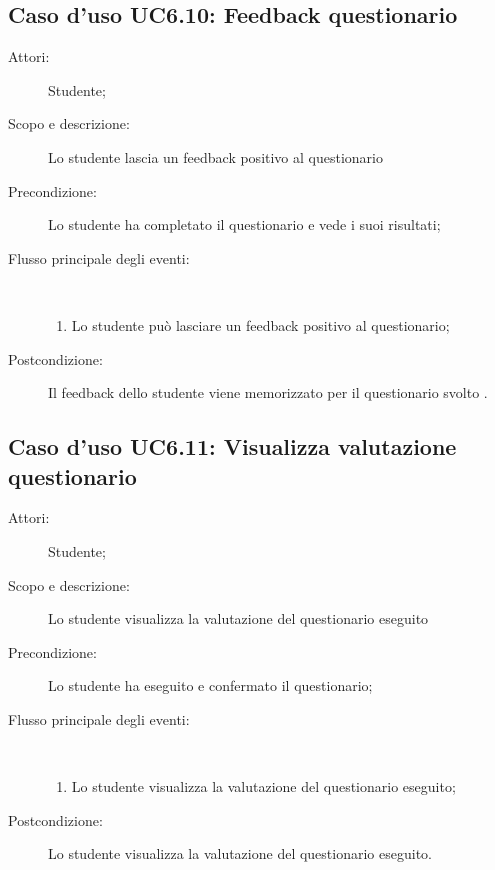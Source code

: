 \subsection{Caso d'uso UC6.10: Feedback questionario}\begin{description}
\item[Attori:] Studente;
\item[Scopo e descrizione:] Lo studente lascia un feedback positivo al questionario
      \item[Precondizione:] Lo studente ha completato il questionario e vede i suoi risultati;

        \item[Flusso principale degli eventi:] \ 
 \begin{enumerate}
          \item Lo studente può lasciare un feedback positivo al questionario;

      \end{enumerate}
    \item[Postcondizione:] Il feedback dello studente viene memorizzato per il questionario svolto .
  \end{description}
\hypertarget{UC6.11}{}
\subsection{Caso d'uso UC6.11: Visualizza valutazione questionario}\begin{description}
\item[Attori:] Studente;
\item[Scopo e descrizione:] Lo studente visualizza la valutazione del questionario eseguito
      \item[Precondizione:] Lo studente ha eseguito e confermato il questionario;

        \item[Flusso principale degli eventi:] \ 
 \begin{enumerate}
          \item Lo studente visualizza la valutazione del questionario eseguito;

      \end{enumerate}
    \item[Postcondizione:] Lo studente visualizza la valutazione del questionario eseguito.
  \end{description}
\hypertarget{UC7}{}
